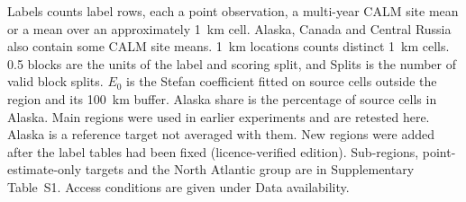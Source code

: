 \begin{table}[htbp]
\noindent Labels counts label rows, each a point observation, a multi-year CALM site mean or a mean over an approximately 1~km cell. Alaska, Canada and Central Russia also contain some CALM site means. 1~km locations counts distinct 1~km cells. 0.5\textdegree{} blocks are the units of the label and scoring split, and Splits is the number of valid block splits. $E_0$ is the Stefan coefficient fitted on source cells outside the region and its 100~km buffer. Alaska share is the percentage of source cells in Alaska. Main regions were used in earlier experiments and are retested here. Alaska is a reference target not averaged with them. New regions were added after the label tables had been fixed (licence-verified edition). Sub-regions, point-estimate-only targets and the North Atlantic group are in Supplementary Table~S1. Access conditions are given under Data availability.
\end{table}
